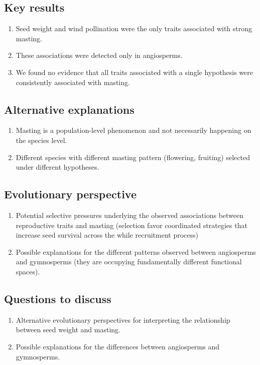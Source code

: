\documentclass[11pt,letter]{article}
\begin{document}
\subsection{Key results}
\begin{enumerate}
\item Seed weight and wind pollination were the only traits associated with strong masting.
\item These associations were detected only in angiosperms.
\item We found no evidence that all traits associated with a single hypothesis were consistently associated with masting.
\end{enumerate}
\subsection{Alternative explanations}
\begin{enumerate}
\item Masting is a population-level phenomenon and not necessarily happening on the species level.
\item Different species with different masting pattern (flowering, fruiting) selected under different hypotheses.
\end{enumerate}
\subsection{Evolutionary perspective}
\begin{enumerate}
\item Potential selective pressures underlying the observed associations between reproductive traits and masting (selection favor coordinated strategies that increase seed survival across the while recruitment process)
\item Possible explanations for the different patterns observed between angiosperms and gymnosperms (they are occupying fundamentally different functional spaces).
\end{enumerate}
\subsection{Questions to discuss}
\begin{enumerate}
\item Alternative evolutionary perspectives for interpreting the relationship between seed weight and masting.
\item Possible explanations for the differences between angiosperms and gymnosperms.
\end{enumerate}
\end{document}
